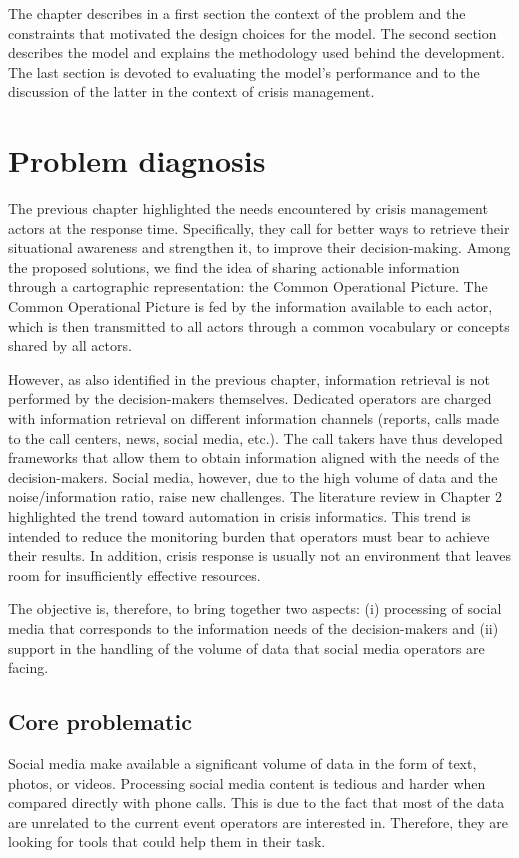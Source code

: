 The chapter describes in a first section the context of the problem and the constraints
that motivated the design choices for the model.
The second section describes the model and explains the methodology used behind the development.
The last section is devoted to evaluating the model's performance and to the
discussion of the latter in the context of crisis management.

\section{Problem diagnosis}
The previous chapter highlighted the needs encountered by crisis management actors at the
response time.
Specifically, they call for better ways to retrieve their situational awareness and strengthen it, to improve their decision-making.
Among the proposed solutions, we find the idea of sharing actionable information through
a cartographic representation: the Common Operational Picture.
The Common Operational Picture is fed by the information available to each actor, which is then transmitted to
all actors through a common vocabulary or concepts shared by all actors.

However, as also identified in the previous chapter, information retrieval is not performed
by the decision-makers themselves.
Dedicated operators are charged with information retrieval on different information channels
(reports, calls made to the call centers, news, social media, etc.).
The call takers have thus developed frameworks that allow them to obtain information
aligned with the needs of the decision-makers.
Social media, however, due to the high volume of data and the noise/information ratio,
raise new challenges.
The literature review in Chapter 2 highlighted the trend toward automation in crisis informatics.
This trend is intended to reduce the monitoring burden that operators must bear to achieve their results.
In addition, crisis response is usually not an environment that leaves room for insufficiently
effective resources.

The objective is, therefore, to bring together two aspects: (i) processing of social media
that corresponds to the information needs of the decision-makers and
(ii) support in the handling of the volume of data that social media operators are facing.

\subsection{Core problematic}
Social media make available a significant volume of data in the form of text, photos, or videos.
Processing social media content is tedious and harder when compared directly with phone calls.
This is due to the fact that most of the data are unrelated to the current event operators are interested in.
Therefore, they are looking for tools that could help them in their task.

